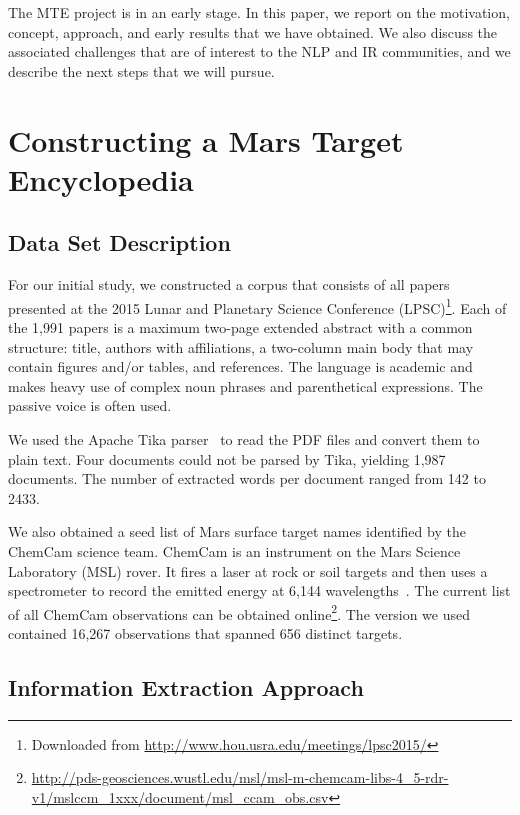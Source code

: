 \documentclass[letterpaper]{article}
\begin{document}
The MTE project is in an early stage.  In this paper, we report on the
motivation, concept, approach, and early results that we have
obtained.  We also discuss the associated challenges that are of
interest to the NLP and IR communities, and we describe the next steps
that we will pursue.  

\section{Constructing a Mars Target Encyclopedia}

\subsection{Data Set Description}

For our initial study, we constructed a corpus that consists of all
papers presented at the 2015 Lunar and Planetary Science
Conference (LPSC)\footnote{Downloaded
from \url{http://www.hou.usra.edu/meetings/lpsc2015/}}. 
Each of the 1,991 papers is a maximum two-page extended abstract with a
common structure: title, authors with affiliations, a two-column main
body that may contain figures and/or tables, and references.  The
language is academic and makes heavy use of complex noun phrases and
parenthetical expressions.  The passive voice is often used.

We used the Apache Tika parser~\cite{mattmann:tika11} to read the PDF
files and convert them to plain text.  Four documents could not be
parsed by Tika, yielding 1,987 documents.  The number of extracted
words per document ranged from 142 to 2433.

We also obtained a seed list of Mars surface target names identified by
the ChemCam science team.  ChemCam is an instrument on the Mars
Science Laboratory (MSL) rover.  It fires a laser at rock or soil targets
and then uses a spectrometer to record the emitted energy at 6,144
wavelengths~\cite{maurice:chemcam12}.  The current list of all ChemCam
observations can be obtained
online\footnote{\url{http://pds-geosciences.wustl.edu/msl/msl-m-chemcam-libs-4_5-rdr-v1/mslccm_1xxx/document/msl_ccam_obs.csv}}.
The version we used contained 16,267 observations that spanned 656
distinct targets.

\subsection{Information Extraction Approach}
\end{document}
